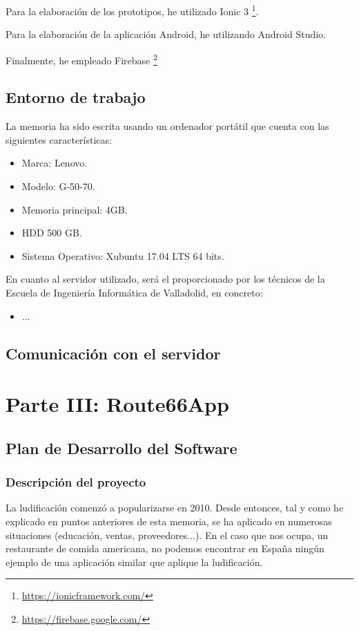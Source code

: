 \documentclass[twoside]{report}
\begin{document}
Para la elaboración de los prototipos, he utilizado Ionic 3 \footnote{\url{https://ionicframework.com/}}.

Para la elaboración de la aplicación Android, he utilizando Android Studio.

Finalmente, he empleado Firebase \footnote{\url{https://firebase.google.com/}}
\section{Entorno de trabajo}

La memoria ha sido escrita usando un ordenador portátil que cuenta con las siguientes características:
\begin{itemize}
\item Marca: Lenovo.
\item Modelo: G-50-70.
\item Memoria principal: 4GB.
\item HDD 500 GB.
\item Sistema Operativo: Xubuntu 17.04 LTS 64 bits.
\end{itemize}

En cuanto al servidor utilizado, será el proporcionado por los técnicos de la Escuela de Ingeniería Informática de Valladolid, en concreto:
\begin{itemize}
\item ...
\end{itemize}
\section{Comunicación con el servidor}

\chapter{Parte III: Route66App}
\section{Plan de Desarrollo del Software}
\subsection{Descripción del proyecto}
La ludificación comenzó a popularizarse en 2010\cite{anatfg}. Desde entonces, tal y como he explicado en puntos anteriores de esta memoria, se ha aplicado en numerosas situaciones (educación, ventas, proveedores...). En el caso que nos ocupa, un restaurante de comida americana, no podemos encontrar en España ningún ejemplo de una aplicación similar que aplique la ludificación.
\end{document}
